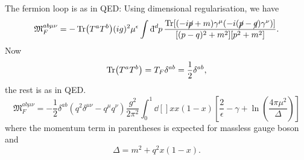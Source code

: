 The fermion loop is as in QED: Using dimensional regularisation, we have
\begin{equation}
  \mathfrak{M}_F^{ab \mu \nu} = - \Tr(T^{a} T^{b}) (ig)^2 \mu^{\epsilon} \int \bdd[d]{p} \frac{\Tr[(-i \cancel{p} + m) \gamma^{\mu} (-i (\cancel{p} - \cancel{q}) \gamma^\nu)]}{[(p - q)^2 + m^2][p^2 + m^2]}.
\end{equation}
Now
\begin{equation}
  \Tr(T^{a} T^{b}) = T_F \delta^{ab} = \frac{1}{2} \delta^{ab},
\end{equation}
the rest is as in QED.
\begin{equation}
  \mathfrak{M}_{F}^{ab \mu \nu} = -\frac{1}{2} \delta^{ab} \left( q^2 \delta^{\mu\nu} - q^{\mu} q^{\nu} \right) \frac{g^2}{2 \pi^2} \int_0^1 \dd[]{x} x(1 - x) \left[ \frac{2}{\epsilon} - \gamma + \ln( \frac{4 \pi \mu^2}{\Delta}) \right]
\end{equation}
where the momentum term in parentheses is expected for massless gauge boson and
\begin{equation}
  \Delta = m^2 + q^2 x(1 - x).
\end{equation}
